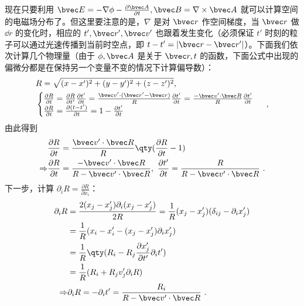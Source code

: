 现在只要利用 $\bvec E=-\nabla \phi-\frac{\partial \bvec A}{\partial t},\bvec B=\nabla\times \bvec A$ 就可以计算空间的电磁场分布了。但这里要注意的是，$\nabla$ 是对 $\bvec r$ 作空间梯度，当 $\bvec r$ 做 $\dd r$ 的变化时，相应的 $t',\bvec r',\bvec v'$ 也跟着发生变化（必须保证 $t'$ 时刻的粒子可以通过光速传播到当前时空点，即 $t-t'=|\bvec r-\bvec r'|$）。下面我们依次计算几个物理量（由于 $\phi,\bvec A$ 是关于 $\bvec r,t$ 的函数，下面公式中出现的偏微分都是在保持另一个变量不变的情况下计算偏导数）：
\begin{equation}
\begin{aligned}
&R=\sqrt{(x-x')^2+(y-y')^2+(z-z')^2},\\
&\begin{cases}
\frac{\partial R}{\partial t}=\frac{\partial R}{\partial t'}\frac{\partial t'}{\partial t}=\frac{\bvec v'\cdot (\bvec r'-\bvec r)}{R}\frac{\partial t'}{\partial t}=\frac{-\bvec v'\cdot \bvec R}{R}\frac{\partial t'}{\partial t}\\
\frac{\partial R}{\partial t}=\frac{\partial (t-t')}{\partial t}=1-\frac{\partial t'}{\partial t}\\
\end{cases}~,
\end{aligned}
\end{equation}
由此得到
\begin{equation}
\begin{aligned}
&\frac{\partial R}{\partial t}=\frac{\bvec v'\cdot \bvec R}{R}\qty(\frac{\partial R}{\partial t}-1)\\
\Rightarrow 
&\frac{\partial R}{\partial t}=\frac{-\bvec v'\cdot \bvec R}{R-\bvec v'\cdot \bvec R},\  
\frac{\partial t'}{\partial t}=\frac{R}{R-\bvec v'\cdot \bvec R}~.
\end{aligned}
\end{equation}
下一步，计算 $\partial _i R=\frac{\partial R}{\partial x_i}$：
\begin{equation}
\begin{aligned}
\partial_i R&=\frac{2(x_j-x_j')\partial_i(x_j-x'_j)}{2R}=\frac{1}{R} (x_j-x_j')(\delta_{ij} - \partial_i x_j')\\
&=\frac{1}{R}(x_i-x_i'-(x_j-x_j')\partial_i x_j')\\
&=\frac{1}{R}\qty(R_i-R_j\frac{\partial x_j'}{\partial t'}\partial_{i} t')\\
&=\frac{1}{R}(R_i+R_jv_j'\partial_i R)\\
\Rightarrow & \partial_i R=-\partial_i t'=\frac{R_i}{R-\bvec v'\cdot \bvec R}~.
\end{aligned}
\end{equation}
